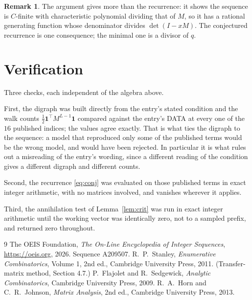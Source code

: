 \documentclass[11pt,a4paper]{article}
\theoremstyle{plain}
\theoremstyle{definition}
\newtheorem{remark}[theorem]{Remark}
\begin{document}
\begin{remark}
The argument gives more than the recurrence: it shows the sequence is $C$-finite with
characteristic polynomial dividing that of $M$, so it has a rational generating function
whose denominator divides $\det(I-xM)$. The conjectured recurrence is one consequence; the
minimal one is a divisor of $q$.
\end{remark}

\section{Verification}

Three checks, each independent of the algebra above.

First, the digraph was built directly from the entry's stated condition and the walk counts
$\tfrac1{2}\mathbf{1}^{\!\top}M^{L-1}\mathbf{1}$ compared against the entry's DATA at
every one of the $16$ published indices; the values agree exactly. That is what ties
the digraph to the sequence: a model that reproduced only some of the published terms would
be the wrong model, and would have been rejected. In particular it is what rules out a
misreading of the entry's wording, since a different reading of the condition gives a
different digraph and different counts.

Second, the recurrence \eqref{eq:conj} was evaluated on those published terms in exact
integer arithmetic, with no matrices involved, and vanishes wherever it applies.

Third, the annihilation test of Lemma~\ref{lem:crit} was run in exact integer arithmetic
until the working vector was identically zero, not to a sampled prefix, and returned zero
throughout.

\begin{thebibliography}{9}
 The OEIS Foundation, \emph{The On-Line Encyclopedia of Integer
Sequences}, \url{https://oeis.org}, 2026. Sequence A209507.
 R.~P.~Stanley, \emph{Enumerative Combinatorics}, Volume 1, 2nd ed.,
Cambridge University Press, 2011. (Transfer-matrix method, Section 4.7.)
 P.~Flajolet and R.~Sedgewick, \emph{Analytic Combinatorics}, Cambridge
University Press, 2009.
 R.~A.~Horn and C.~R.~Johnson, \emph{Matrix Analysis}, 2nd ed., Cambridge
University Press, 2013.
\end{thebibliography}
\end{document}
